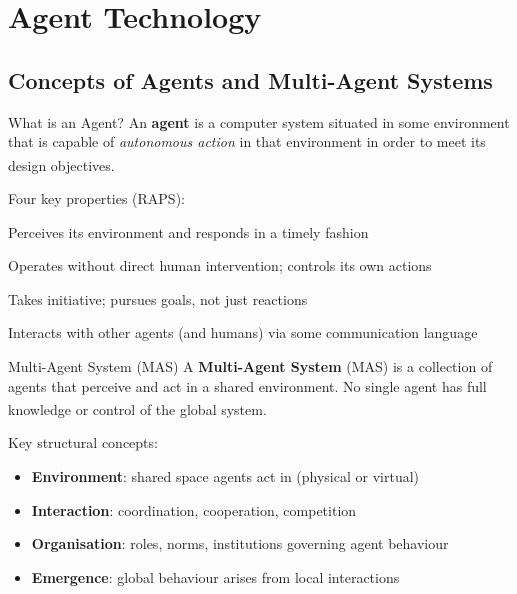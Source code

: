\section{Agent Technology}

\subsection{Concepts of Agents and Multi-Agent Systems}

\begin{v3topic}{What is an Agent?}
    An \textbf{agent} is a computer system situated in some environment that is
    capable of \emph{autonomous action} in that environment in order to meet its
    design objectives.\textsuperscript{\cite[][p.~28]{wooldridgeIntroductionMultiAgentSystems2009}}

    Four key properties (RAPS):
    \begin{description}[leftmargin=0.6cm, labelindent=0pt]
        \item[\textbf{Reactivity}] Perceives its environment and responds in a timely fashion
        \item[\textbf{Autonomy}] Operates without direct human intervention; controls its own actions
        \item[\textbf{Proactivity}] Takes initiative; pursues goals, not just reactions
        \item[\textbf{Social ability}] Interacts with other agents (and humans) via some communication language
    \end{description}

\end{v3topic}
\begin{v3topic}{Multi-Agent System (MAS)}
    A \textbf{Multi-Agent System} (MAS) is a collection of agents that perceive
    and act in a shared environment. No single agent has full knowledge or control
    of the global
    system.\textsuperscript{\cite[][p.~2]{weissMultiagentSystems2013}}

    Key structural concepts:
    \begin{itemize}
        \item \textbf{Environment}: shared space agents act in (physical or virtual)
        \item \textbf{Interaction}: coordination, cooperation, competition
        \item \textbf{Organisation}: roles, norms, institutions governing agent behaviour
        \item \textbf{Emergence}: global behaviour arises from local interactions
    \end{itemize}

\end{v3topic}
